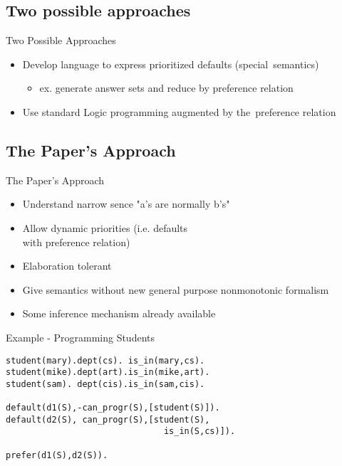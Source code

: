 \documentclass{beamer}
\begin{document}
  \subsection[Approaches]{Two possible approaches}

  \begin{frame}{Two Possible Approaches}
    \begin{itemize}
      \item Develop language to express prioritized defaults (special~semantics)
      \begin{itemize}
        \item ex. generate answer sets and reduce by preference relation
      \end{itemize}
      \item Use standard Logic programming augmented by the~preference relation
    \end{itemize}
  \end{frame}

  \subsection[The Paper's Approach]{The Paper's Approach}

  \begin{frame}{The Paper's Approach}
    \begin{itemize}
      \item Understand narrow sence "a's are normally b's"
      \item Allow dynamic priorities (i.e. defaults \\ with preference relation)
      \item Elaboration tolerant
      \item Give semantics without new general purpose nonmonotonic formalism
      \item Some inference mechanism already available
    \end{itemize}
  \end{frame}

  
  \begin{frame}{Example - Programming Students}
    \begin{alltt}
student(mary). dept(cs). \ is\_in(mary,cs). \\
student(mike). dept(art). is\_in(mike,art).\\
student(sam). \ dept(cis). is\_in(sam,cis). \\ ~ \\
default(d1(S), -can\_progr(S), [student(S)]). \\
default(d2(S), \ can\_progr(S), [student(S), \\
\ \ \ \ \ \ \ \ \ \ \ \ \ \ \ \ \ \ \ \ \ \ \ \ \ \ \ \ \ \ \ is\_in(S,cs)]).\\ ~ \\
prefer(d1(S), d2(S)).
    \end{alltt}
  \end{frame}
  
\end{document}
